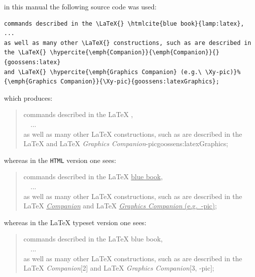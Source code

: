 \smallskip\noindent\label{hyperciteXmpl}%
%
\html{\\}\noindent
{} in this manual the following source code was used:
\begin{small}
\begin{verbatim}
commands described in the \LaTeX{} \htmlcite{blue book}{lamp:latex}, 
...
as well as many other \LaTeX{} constructions, such as are described in 
the \LaTeX{} \hypercite{\emph{Companion}}{\emph{Companion}}{}{goossens:latex} 
and \LaTeX{} \hypercite{\emph{Graphics Companion} (e.g.\ \Xy-pic)}%
{\emph{Graphics Companion}}{\Xy-pic}{goossens:latexGraphics};
\end{verbatim}
\end{small}
which produces:
\begin{quote}
commands described in the \LaTeX{} , 
\\~~...\\
as well as many other \LaTeX{} constructions, such as are described in 
the \LaTeX{}  
and \LaTeX{} %
{\emph{Graphics Companion}}{\Xy-pic}{goossens:latexGraphics};
\end{quote}
\begin{latexonly}
whereas in the \texttt{HTML} version one sees:
\begin{quote}
commands described in the \LaTeX{} \underline{blue book}, 
\\~~...\\
as well as many other \LaTeX{} constructions, 
such as are described in the \LaTeX{} \underline{\emph{Companion}} 
and  \LaTeX{} \underline{\emph{Graphics Companion} (e.g.\ \Xy-pic)};
\end{quote}
\end{latexonly}
%
\begin{htmlonly}
whereas in the \LaTeX{} typeset version one sees:
\begin{quote}
commands described in the \LaTeX{} blue book,\\
~~...\\
as well as many other \LaTeX{} constructions, such as are described in the \LaTeX{} 
\textit{Companion}[2] and \LaTeX{} \textit{Graphics Companion}[3, \Xy-pic];
\end{quote}
\end{htmlonly}


